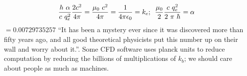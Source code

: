 
\maketitle
\begin{multicols}{2}
$${{h ~ \alpha} \over c~ q_e^2}{ 2 c^2 \over 4\pi }={ \mu _{0}~c^2 \over 4\pi }={1\over 4 \pi \epsilon _0}=k_e;\hspace{0.5em}{{\mu _{0} }\over 2}{c ~ q_e^2 \over 2~\pi ~\hbar}=\alpha $$
$= 0.00729735257$ ``It has been a mystery ever since it was discovered more than fifty years ago, and all good theoretical physicists put this number up on their wall and worry about it.''\citep[p. 129]{feynman1985qed}. %
Some CFD software uses planck units to reduce computation by reducing the billions of multiplications of $k_b$; we should care about people as much as machines.

\end{multicols}
